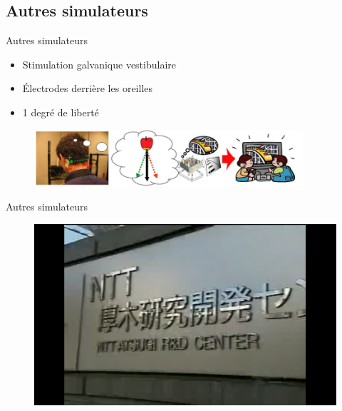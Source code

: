 \documentclass[compress, noflama]{beamer}
\begin{document}
\subsection{Autres simulateurs}

{
\begin{frame}{Autres simulateurs}
\begin{itemize}
\item Stimulation galvanique vestibulaire
\item Électrodes derrière les oreilles
\item 1 degré de liberté
\end{itemize}
\begin{figure}
\centering
\includegraphics[width=10cm]{images/gvs_RV}
\end{figure}
\end{frame}

\begin{frame}{Autres simulateurs}
\begin{figure}
\href{run:videos/GVS.mp4}{\includegraphics[width=\linewidth]{images/gvs}}
\end{figure}

\end{frame}
}
\end{document}
